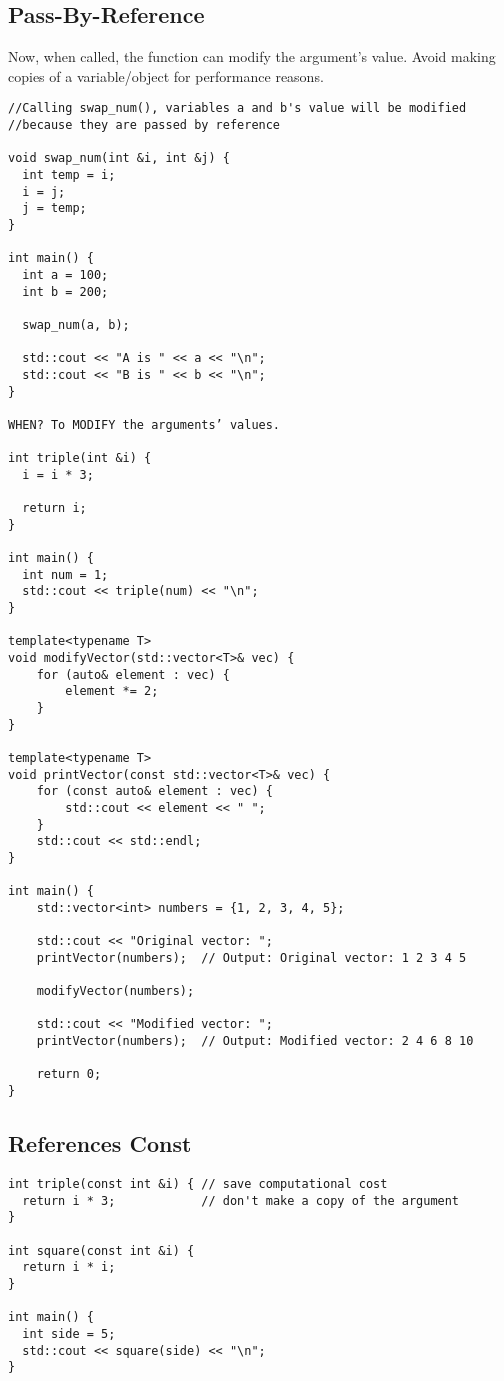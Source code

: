 \subsection{Pass-By-Reference}

Now, when called, the function can modify the argument's value.
Avoid making copies of a variable/object for performance reasons.

\begin{verbatim}
//Calling swap_num(), variables a and b's value will be modified
//because they are passed by reference

void swap_num(int &i, int &j) {
  int temp = i;
  i = j;
  j = temp;
}
 
int main() {
  int a = 100;
  int b = 200;
 
  swap_num(a, b);
 
  std::cout << "A is " << a << "\n";
  std::cout << "B is " << b << "\n";
}

WHEN? To MODIFY the arguments’ values.

int triple(int &i) {
  i = i * 3;
  
  return i;
}

int main() {
  int num = 1;
  std::cout << triple(num) << "\n";
}

template<typename T>
void modifyVector(std::vector<T>& vec) {
    for (auto& element : vec) {
        element *= 2;
    }
}

template<typename T>
void printVector(const std::vector<T>& vec) {
    for (const auto& element : vec) {
        std::cout << element << " ";
    }
    std::cout << std::endl;
}

int main() {
    std::vector<int> numbers = {1, 2, 3, 4, 5};

    std::cout << "Original vector: ";
    printVector(numbers);  // Output: Original vector: 1 2 3 4 5

    modifyVector(numbers);

    std::cout << "Modified vector: ";
    printVector(numbers);  // Output: Modified vector: 2 4 6 8 10

    return 0;
}
\end{verbatim}

\subsection{References Const}

\begin{verbatim}
int triple(const int &i) { // save computational cost
  return i * 3;            // don't make a copy of the argument
}

int square(const int &i) {
  return i * i;
}

int main() {
  int side = 5;
  std::cout << square(side) << "\n";
}
\end{verbatim}

